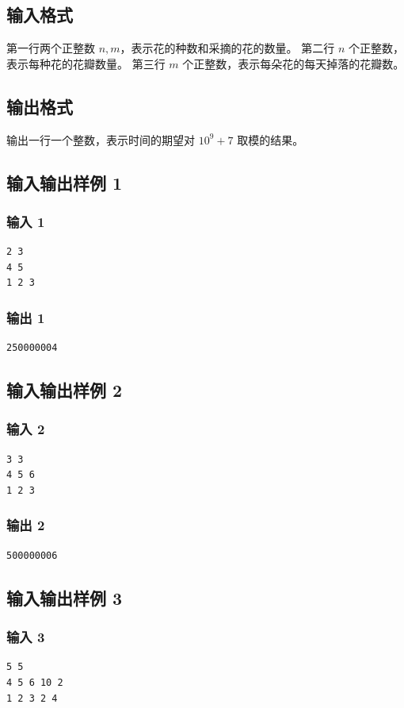 \documentclass[12pt,a4paper,oneside]{ctexart}
\begin{document}
\subsection*{输入格式}
第一行两个正整数 $n,m$，表示花的种数和采摘的花的数量。
第二行 $n$ 个正整数，表示每种花的花瓣数量。
第三行 $m$ 个正整数，表示每朵花的每天掉落的花瓣数。
\subsection*{输出格式}
输出一行一个整数，表示时间的期望对 $10^9+7$ 取模的结果。
\subsection*{输入输出样例 1}
\subsubsection*{输入 1}
\begin{verbatim}
2 3
4 5
1 2 3
\end{verbatim}
\subsubsection*{输出 1}
\begin{verbatim}
250000004
\end{verbatim}
\subsection*{输入输出样例 2}
\subsubsection*{输入 2}
\begin{verbatim}
3 3
4 5 6
1 2 3
\end{verbatim}
\subsubsection*{输出 2}
\begin{verbatim}
500000006
\end{verbatim}
\subsection*{输入输出样例 3}
\subsubsection*{输入 3}
\begin{verbatim}
5 5
4 5 6 10 2
1 2 3 2 4
\end{verbatim}
\end{document}
